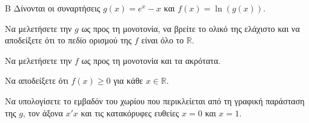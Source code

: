 \begin{thema}{Β}
Δίνονται οι συναρτήσεις $g(x) = e^x - x$ και $f(x) = \ln(g(x))$.
\begin{erwthma}
\item Να μελετήσετε την $g$ ως προς τη μονοτονία, να βρείτε το ολικό της ελάχιστο και να αποδείξετε ότι το πεδίο ορισμού της $f$ είναι όλο το $\mathbb{R}$.
\item Να μελετήσετε την $f$ ως προς τη μονοτονία και τα ακρότατα.
\item Να αποδείξετε ότι $f(x) \ge 0$ για κάθε $x \in \mathbb{R}$.
\item Να υπολογίσετε το εμβαδόν του χωρίου που περικλείεται από τη γραφική παράσταση της $g$, τον άξονα $x'x$ και τις κατακόρυφες ευθείες $x=0$ και $x=1$.
\end{erwthma}
\end{thema}
